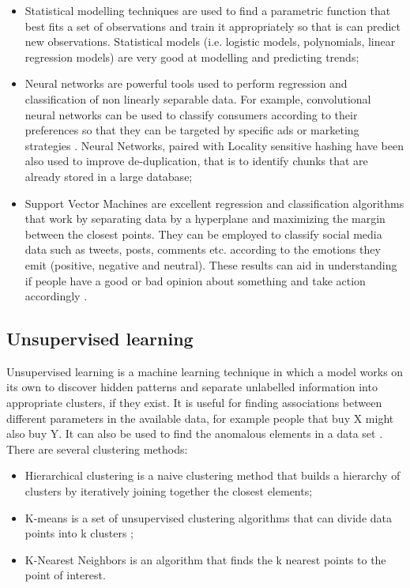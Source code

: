\begin{itemize} 
\item Statistical modelling techniques are used to find a parametric function that best fits a set of observations and train it appropriately so that is can predict new observations. Statistical models (i.e. logistic models, polynomials, linear regression models) are very good at modelling and predicting trends;
\item Neural networks are powerful tools used to perform regression and classification of non linearly separable data. For example, convolutional neural networks can be used to classify consumers according to their preferences so that they can be targeted by specific ads or marketing strategies \cite{socialtrends}. Neural Networks, paired with Locality sensitive hashing \cite{lsh} have been also used to improve de-duplication, that is to identify chunks that are already stored in a large database;
\item Support Vector Machines are excellent regression and classification algorithms that work by separating data by a hyperplane and maximizing the margin between the closest points. They can be employed to classify social media data such as tweets, posts, comments etc. according to the emotions they emit (positive, negative and neutral). These results can aid in understanding if people have a good or bad opinion about something and take action accordingly \cite{sentimentanalysis}.
\end{itemize}  


\subsection{Unsupervised learning}
Unsupervised learning is a machine learning technique in which a model works on its own to discover hidden patterns and separate unlabelled information into appropriate clusters, if they exist. It is useful for finding associations between different parameters in the available data, for example people that buy X might also buy Y. It can also be used to find the anomalous elements in a data set \cite{kmeans}. There are several clustering methods:
\begin{itemize} 
\item Hierarchical clustering is a naive clustering method that builds a hierarchy of clusters by iteratively joining together the closest elements;
\item K-means is a set of unsupervised clustering algorithms that can divide data points into k clusters  \cite{kmeans};
\item K-Nearest Neighbors is an algorithm that finds the k nearest points to the point of interest.
\end{itemize}

